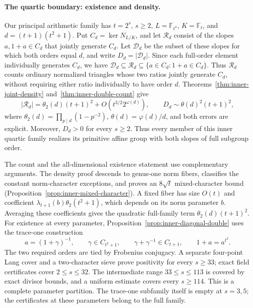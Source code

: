 \documentclass[11pt]{article}
\begin{document}
\paragraph{The quartic boundary: existence and density.}
Our principal arithmetic family has $t=2^s$, $s\ge2$,
$L=\mathbb F_{t^4}$, $K=\mathbb F_t$, and
$d=(t+1)(t^2+1)$. Put $C_d=\ker N_{L/K}$, and let
$\mathcal R_d$ consist of the slopes $a,1+a\in C_d$ that
jointly generate $C_d$. Let $\mathcal D_d$ be the subset of these slopes for which both orders equal $d$, and write $D_d=|\mathcal D_d|$. Since each full-order element individually generates $C_d$, we have $\mathcal D_d\subseteq\mathcal R_d\subseteq\{a\in C_d:1+a\in C_d\}$. Thus $\mathcal R_d$ counts ordinary normalized triangles whose two ratios jointly generate $C_d$, without requiring either ratio individually to have order $d$. Theorems~\ref{thm:inner-joint-density}
and~\ref{thm:inner-double-count} give
\[
 |\mathcal R_d|
   =\theta_2(d)(t+1)^2+O(t^{3/2}2^{\omega(d)}),
 \qquad
 D_d\sim\theta(d)^2(t+1)^2,
\]
where $\theta_2(d)=\prod_{p\mid d}(1-p^{-2})$,
$\theta(d)=\varphi(d)/d$, and both errors are explicit.
Moreover, $D_d>0$ for every $s\ge2$. Thus every member of
this inner quartic family realizes its primitive affine group
with both slopes of full subgroup order.

The count and the all-dimensional existence statement use
complementary arguments. The density proof descends to genus-one
norm fibers, classifies the constant norm-character exceptions,
and proves an $8\sqrt t$ mixed-character bound
(Proposition~\ref{prop:inner-mixed-character}).
A fixed fiber has size $O(t)$ and coefficient
$\lambda_{t+1}(b)\theta_2(t^2+1)$, which depends on its norm
parameter $b$. Averaging these coefficients gives the quadratic
full-family term $\theta_2(d)(t+1)^2$.
For existence at every parameter, Proposition~\ref{prop:inner-diagonal-double}
uses the trace-one construction
\[
 a=(1+\gamma)^{-1},\qquad
 \gamma\in C_{t^2+1},\qquad
 \gamma+\gamma^{-1}\in C_{t+1},\qquad
 1+a=a^{t^2}.
\]
The two required orders are tied by Frobenius conjugacy.
A separate four-point Lang cover and a two-character sieve prove
positivity for every $s\ge33$; exact field certificates cover
$2\le s\le32$. The intermediate range $33\le s\le113$ is
covered by exact divisor bounds, and a uniform estimate covers
every $s\ge114$. This is a complete parameter partition.
The trace-one subfamily itself is empty at $s=3,5$; the
certificates at these parameters belong to the full family.
\end{document}

